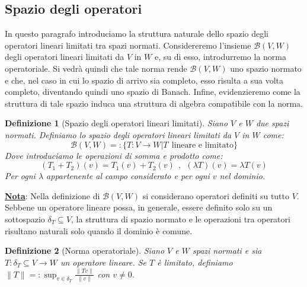 \documentclass[a4paper,12pt]{report}
\newtheorem{definizione}{Definizione}[chapter]
\begin{document}
\newpage

\subsection{Spazio degli operatori}

In questo paragrafo introduciamo la struttura naturale dello spazio degli operatori lineari limitati tra spazi normati. Considereremo l’insieme $\mathcal B(V,W)$ degli operatori lineari limitati da $V$ in $W$ e, su di esso, introdurremo la norma operatoriale. Si vedrà quindi che tale norma rende $\mathcal B(V,W)$ uno spazio normato e che, nel caso in cui lo spazio di arrivo sia completo, esso risulta a sua volta completo, diventando quindi uno spazio di Banach. Infine, evidenzieremo come la struttura di tale spazio induca una struttura di algebra compatibile con la norma.
\begin{definizione}[Spazio degli operatori lineari limitati]\label{def: 5.2}
    Siano $V$ e $W$ due spazi normati. Definiamo lo spazio degli operatori lineari limitati da $V$ in $W$ come:
    \[\mathcal{B}(V,W)=:\{T:V\to W| T\ \   \text{lineare e limitato}\}\]
    Dove introduciamo le operazioni di somma e prodotto come:
    \[ (T_1+T_2)(v)=T_1(v)+T_2(v) \ \ , \ \ (\lambda T)(v)=\lambda T(v)\]
    Per ogni $\lambda $ appartenente al campo considerato e per ogni $v$ nel dominio.
\end{definizione}

\underline{\textbf{Nota}}: Nella definizione di \(\mathcal B(V,W)\) si considerano operatori definiti su tutto \(V\). Sebbene un operatore lineare possa, in generale, essere definito solo su un sottospazio \(\delta_T \subseteq V\), la struttura di spazio normato e le operazioni tra operatori risultano naturali solo quando il dominio è comune.

\begin{definizione}[Norma operatoriale]\label{def: 5.3}
    Siano $V$ e $W$ spazi normati e sia $T:\delta_T\subseteq V\to W$ un operatore lineare. Se $T$ è limitato, definiamo $\|T\|=:\displaystyle\sup_{v\in \delta_T}\frac{\|Tv\|}{\|v\|}$ con $v\neq 0$.
\end{definizione}
\end{document}
